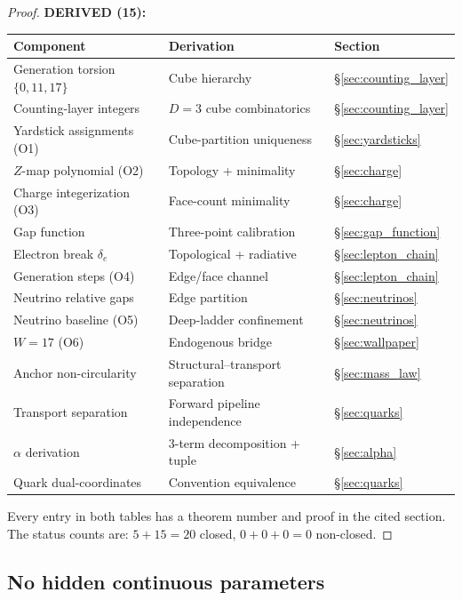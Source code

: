 \documentclass[11pt,a4paper]{article}
\theoremstyle{definition}
\theoremstyle{remark}
\newcommand{\Zidx}{Z}
\begin{document}
\begin{proof}
\medskip
\noindent\textbf{DERIVED (15):}
\begin{center}
\small
\begin{tabular}{lll}
\toprule
Component & Derivation & Section \\
\midrule
Generation torsion $\{0,11,17\}$ & Cube hierarchy & \S\ref{sec:counting_layer} \\
Counting-layer integers & $D = 3$ cube combinatorics & \S\ref{sec:counting_layer} \\
Yardstick assignments (O1) & Cube-partition uniqueness & \S\ref{sec:yardsticks} \\
$\Zidx$-map polynomial (O2) & Topology + minimality & \S\ref{sec:charge} \\
Charge integerization (O3) & Face-count minimality & \S\ref{sec:charge} \\
Gap function & Three-point calibration & \S\ref{sec:gap_function} \\
Electron break $\delta_e$ & Topological + radiative & \S\ref{sec:lepton_chain} \\
Generation steps (O4) & Edge/face channel & \S\ref{sec:lepton_chain} \\
Neutrino relative gaps & Edge partition & \S\ref{sec:neutrinos} \\
Neutrino baseline (O5) & Deep-ladder confinement & \S\ref{sec:neutrinos} \\
$W = 17$ (O6) & Endogenous bridge & \S\ref{sec:wallpaper} \\
Anchor non-circularity & Structural--transport separation & \S\ref{sec:mass_law} \\
Transport separation & Forward pipeline independence & \S\ref{sec:quarks} \\
$\alpha$ derivation & 3-term decomposition + tuple & \S\ref{sec:alpha} \\
Quark dual-coordinates & Convention equivalence & \S\ref{sec:quarks} \\
\bottomrule
\end{tabular}
\end{center}

\noindent
Every entry in both tables has a theorem number and proof in the cited
section.  The status counts are: $5 + 15 = 20$ closed, $0 + 0 + 0 = 0$
non-closed.
\end{proof}

\subsection{No hidden continuous parameters}
\end{document}
